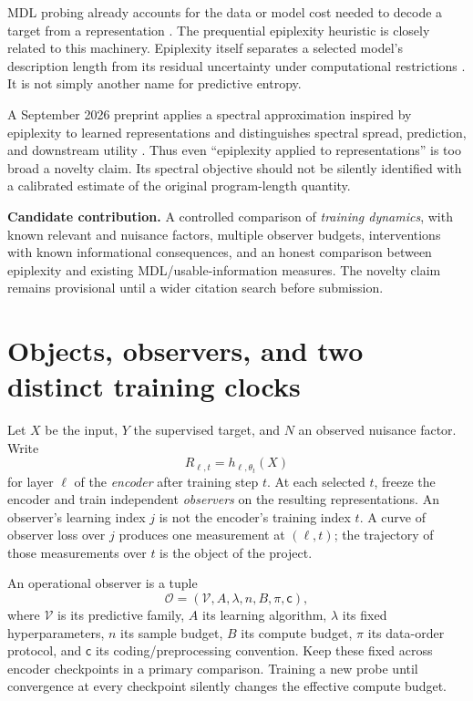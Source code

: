 \documentclass[11pt,a4paper]{article}
\newcommand{\V}{\mathcal V}
\begin{document}
MDL probing already accounts for the data or model cost needed to decode a target from a representation \citep{blier2018,voita2020}. The prequential epiplexity heuristic is closely related to this machinery. Epiplexity itself separates a selected model's description length from its residual uncertainty under computational restrictions \citep{finzi2026}. It is not simply another name for predictive entropy.

A September 2026 preprint applies a spectral approximation inspired by epiplexity to learned representations and distinguishes spectral spread, prediction, and downstream utility \citep{vivekananda2026}. Thus even ``epiplexity applied to representations'' is too broad a novelty claim. Its spectral objective should not be silently identified with a calibrated estimate of the original program-length quantity.

\textbf{Candidate contribution.} A controlled comparison of \emph{training dynamics}, with known relevant and nuisance factors, multiple observer budgets, interventions with known informational consequences, and an honest comparison between epiplexity and existing MDL/usable-information measures. The novelty claim remains provisional until a wider citation search before submission.

\section{Objects, observers, and two distinct training clocks}

Let $X$ be the input, $Y$ the supervised target, and $N$ an observed nuisance factor. Write
\[
R_{\ell,t}=h_{\ell,\theta_t}(X)
\]
for layer $\ell$ of the \emph{encoder} after training step $t$. At each selected $t$, freeze the encoder and train independent \emph{observers} on the resulting representations. An observer's learning index $j$ is not the encoder's training index $t$. A curve of observer loss over $j$ produces one measurement at $(\ell,t)$; the trajectory of those measurements over $t$ is the object of the project.

An operational observer is a tuple
\[
\mathcal O=(\V,A,\lambda,n,B,\pi,\mathsf c),
\]
where $\V$ is its predictive family, $A$ its learning algorithm, $\lambda$ its fixed hyperparameters, $n$ its sample budget, $B$ its compute budget, $\pi$ its data-order protocol, and $\mathsf c$ its coding/preprocessing convention. Keep these fixed across encoder checkpoints in a primary comparison. Training a new probe until convergence at every checkpoint silently changes the effective compute budget.
\end{document}
